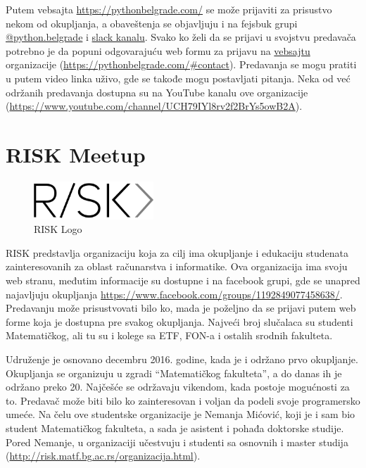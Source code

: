 \documentclass[a4paper]{article}
\begin{document}
{Putem vebsajta \url{https://pythonbelgrade.com/} se može prijaviti za prisustvo nekom od okupljanja, a obaveštenja se objavljuju i na fejsbuk grupi \href{https://www.facebook.com/python.belgrade/}{@python.belgrade} i \href{https://pythonbelgrade.slack.com/join/shared_invite/enQtNTM0OTI4NzY3NDI2LTk2OThkNjQ2YmM5NWNkNTBjMjU3NDY0NjcyNDFiYmZmNjQ4MDE3NjczYWM0NTk1YWVlYzlhNGIwYjU3NjA3Y2Y}{slack kanalu}. Svako ko želi da se prijavi u svojstvu predavača potrebno je da popuni odgovarajuću web formu za prijavu na \href{https://pythonbelgrade.com/}{vebsajtu} organizacije (\url{https://pythonbelgrade.com/#contact}). Predavanja se mogu pratiti u putem video linka uživo, gde se takođe mogu postavljati pitanja. Neka od već održanih predavanja dostupna su na YouTube kanalu ove organizacije (\url{https://www.youtube.com/channel/UCH79IYl8rv2f2BrYs5owB2A}).


\section{RISK Meetup}
\label{sec:riskmatf}

\begin{figure}[h!]
  \centering
  \includegraphics[width=0.4\textwidth]{riskmatf.png}
  \caption{RISK Logo}
\end{figure}

RISK predstavlja organizaciju koja za cilj ima okupljanje i edukaciju studenata zainteresovanih za oblast računarstva i informatike. \cite{aboutRisk}
Ova organizacija ima svoju web stranu, međutim informacije su dostupne i na facebook grupi, gde se unapred najavljuju okupljanja \url{https://www.facebook.com/groups/1192849077458638/}. Predavanju može prisustvovati bilo ko, mada je poželjno da se prijavi putem web forme koja je dostupna pre svakog okupljanja. Najveći broj slučalaca su
studenti Matematičkog, ali tu su i kolege sa ETF, FON-a i ostalih srodnih fakulteta.

Udruženje je osnovano decembru 2016. godine, kada je i održano prvo okupljanje. Okupljanja se organizuju u zgradi ``Matematičkog fakulteta'', a do danas ih je održano preko 20. Najčešće se održavaju vikendom, kada postoje mogućnosti za to. Predavač može biti bilo ko zainteresovan i voljan da podeli svoje programersko umeće. Na čelu ove studentske organizacije je Nemanja Mićović, koji je i sam bio student Matematičkog fakulteta, a sada je asistent i pohađa doktorske studije. Pored Nemanje, u organizaciji učestvuju i studenti sa osnovnih i master studija (\url{http://risk.matf.bg.ac.rs/organizacija.html}).

}
\end{document}
